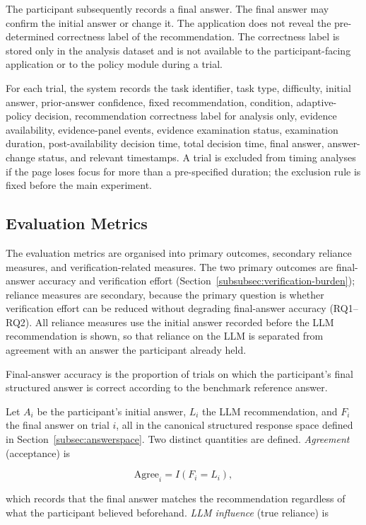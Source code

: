 \documentclass[oneside,final,14pt,a4paper]{extreport}
\begin{document}
The participant subsequently records a final answer. The final answer may
confirm the initial answer or change it. The application does not reveal the
pre-determined correctness label of the recommendation. The correctness label
is stored only in the analysis dataset and is not available to the
participant-facing application or to the policy module during a trial.

For each trial, the system records the task identifier, task type, difficulty,
initial answer, prior-answer confidence, fixed recommendation, condition,
adaptive-policy decision, recommendation correctness label for analysis only,
evidence availability, evidence-panel events, evidence examination status,
examination duration, post-availability decision time, total decision time,
final answer, answer-change status, and relevant timestamps. A trial is
excluded from timing analyses if the page loses focus for more than a
pre-specified duration; the exclusion rule is fixed before the main experiment.

\subsection{Evaluation Metrics}
\label{subsec:metrics}

The evaluation metrics are organised into primary outcomes, secondary reliance
measures, and verification-related measures. The two primary outcomes are
final-answer accuracy and verification effort
(Section~\ref{subsubsec:verification-burden}); reliance measures are
secondary, because the primary question is whether verification effort can be
reduced without degrading final-answer accuracy (RQ1--RQ2). All reliance
measures use the initial answer recorded before the LLM recommendation is
shown, so that reliance on the LLM is separated from agreement with an answer
the participant already held.

Final-answer accuracy is the proportion of trials on which the participant's
final structured answer is correct according to the benchmark reference
answer.

Let $A_i$ be the participant's initial answer, $L_i$ the LLM recommendation,
and $F_i$ the final answer on trial $i$, all in the canonical structured
response space defined in Section~\ref{subsec:answerspace}. Two distinct
quantities are defined. \emph{Agreement} (acceptance) is

$$
\text{Agree}_i = I(F_i = L_i),
$$

which records that the final answer matches the recommendation regardless of
what the participant believed beforehand. \emph{LLM influence} (true reliance)
is
\end{document}
